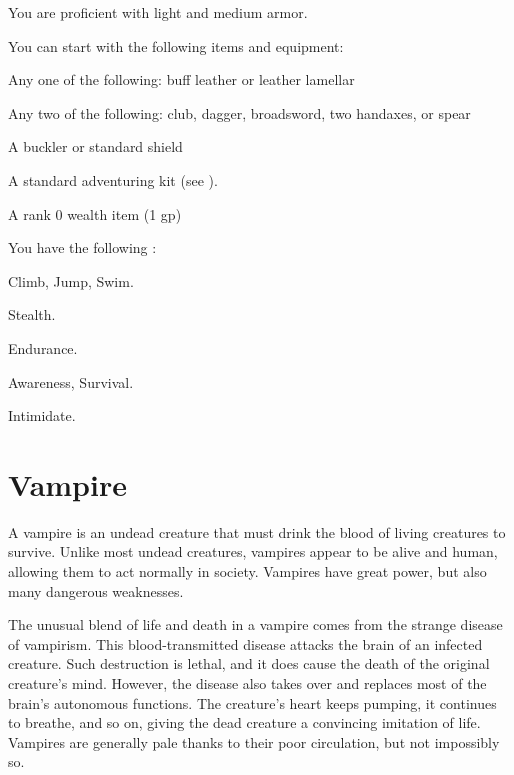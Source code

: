       You are proficient with light and medium armor.

    You can start with the following items and equipment:
    \begin{raggeditemize}
        \item Any one of the following: buff leather or leather lamellar
        \item Any two of the following: club, dagger, broadsword, two handaxes, or spear
        \item A buckler or standard shield
        \item A standard adventuring kit (see ).
        \item A rank 0 wealth item (1 gp)
    \end{raggeditemize}

      You have the following :

      \begin{raggeditemize}
        \item {} Climb, Jump, Swim.
        \item {} Stealth.
        \item {} Endurance.
        \item {} Awareness, Survival.
        \item {} Intimidate.
      \end{raggeditemize}

\section{Vampire}
  A vampire is an undead creature that must drink the blood of living creatures to survive.
  Unlike most undead creatures, vampires appear to be alive and human, allowing them to act normally in society.
  Vampires have great power, but also many dangerous weaknesses.

  The unusual blend of life and death in a vampire comes from the strange disease of vampirism.
  This blood-transmitted disease attacks the brain of an infected creature.
  Such destruction is lethal, and it does cause the death of the original creature's mind.
  However, the disease also takes over and replaces most of the brain's autonomous functions.
  The creature's heart keeps pumping, it continues to breathe, and so on, giving the dead creature a convincing imitation of life.
  Vampires are generally pale thanks to their poor circulation, but not impossibly so.

